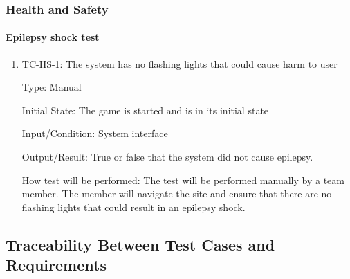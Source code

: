 \documentclass[12pt, titlepage]{article}
\begin{document}
\subsubsection{Health and Safety}

\paragraph{Epilepsy shock test}
\begin{enumerate}
\item{TC-HS-1: The system has no flashing lights that could cause harm to user}

Type: Manual
					
Initial State: The game is started and is in its initial state
					
Input/Condition: System interface
					
Output/Result: True or false that the system did not cause epilepsy.
					
How test will be performed: The test will be performed manually by a team member. The member will navigate the site and ensure that there are no flashing lights that could result in an epilepsy shock.
\end{enumerate}

\subsection{Traceability Between Test Cases and Requirements}
\end{document}
